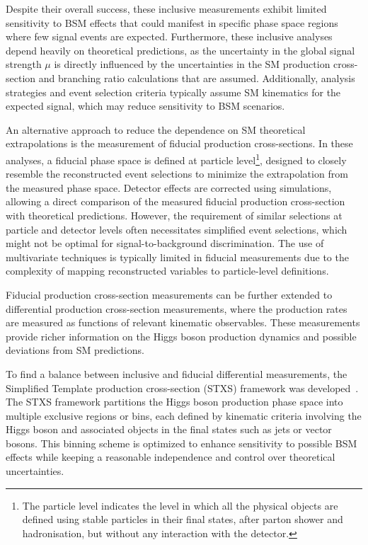 Despite their overall success, these inclusive measurements exhibit limited sensitivity to BSM effects that could manifest in specific phase space regions where few signal events are expected. Furthermore, these inclusive analyses depend heavily on theoretical predictions, as the uncertainty in the global signal strength $\mu$ is directly influenced by the uncertainties in the SM production cross-section and branching ratio calculations that are assumed. Additionally, analysis strategies and event selection criteria typically assume SM kinematics for the expected signal, which may reduce sensitivity to BSM scenarios.

An alternative approach to reduce the dependence on SM theoretical extrapolations is the measurement of fiducial production cross-sections. In these analyses, a fiducial phase space is defined at particle level\footnote{The particle level indicates the level in which all the physical objects are defined using stable particles in their final states, after parton shower and hadronisation, but without any interaction with the detector.}, designed to closely resemble the reconstructed event selections to minimize the extrapolation from the measured phase space. Detector effects are corrected using simulations, allowing a direct comparison of the measured fiducial production cross-section with theoretical predictions. However, the requirement of similar selections at particle and detector levels often necessitates simplified event selections, which might not be optimal for signal-to-background discrimination. The use of multivariate techniques is typically limited in fiducial measurements due to the complexity of mapping reconstructed variables to particle-level definitions.

Fiducial production cross-section measurements can be further extended to differential production cross-section measurements, where the production rates are measured as functions of relevant kinematic observables. These measurements provide richer information on the Higgs boson production dynamics and possible deviations from SM predictions.

To find a balance between inclusive and fiducial differential measurements, the Simplified Template production cross-section (STXS) framework was developed~\cite{badger2016leshouches2015physics}. The STXS framework partitions the Higgs boson production phase space into multiple exclusive regions or bins, each defined by kinematic criteria involving the Higgs boson and associated objects in the final states such as jets or vector bosons. This binning scheme is optimized to enhance sensitivity to possible BSM effects while keeping a reasonable independence and control over theoretical uncertainties.

